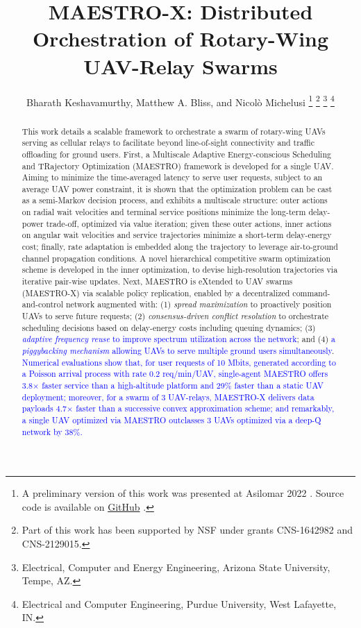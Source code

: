 \documentclass[12pt, draftcls, onecolumn]{IEEEtran}
\title{MAESTRO-X: Distributed Orchestration of Rotary-Wing UAV-Relay Swarms}
\author{Bharath Keshavamurthy\IEEEauthorrefmark{1}, Matthew A. Bliss\IEEEauthorrefmark{2}, and Nicol\`{o} Michelusi\IEEEauthorrefmark{1}
\thanks{A preliminary version of this work was presented at Asilomar 2022 \cite{ASILOMAR}. Source code is available on \href{https://github.com/bharathkeshavamurthy/MAESTRO-X.git}{GitHub} \cite{MAESTRO-X}.}
\thanks{Part of this work has been supported by NSF under grants CNS-1642982 and CNS-2129015.}
\thanks{\IEEEauthorrefmark{1}Electrical, Computer and Energy Engineering, Arizona State University, Tempe, AZ.}
\thanks{\IEEEauthorrefmark{2}Electrical and Computer Engineering, Purdue University, West Lafayette, IN.}
\vspace{-6mm}
}
\theoremstyle{plain}
\theoremstyle{definition}
\theoremstyle{remark}
\newcommand\hlt[1]{\textcolor{blue}{#1}}
\begin{document}

\maketitle
\thispagestyle{plain}
\pagestyle{plain}
\vspace{-12mm}
\begin{abstract}
This work details a scalable framework to orchestrate a swarm of rotary-wing UAVs serving as cellular relays to facilitate beyond line-of-sight connectivity and traffic offloading for ground users. First, a Multiscale Adaptive Energy-conscious Scheduling and TRajectory Optimization (MAESTRO) framework is developed for a single UAV. Aiming to minimize the time-averaged latency to serve user requests, subject to an average UAV power constraint, it is shown that the optimization problem can be cast as a semi-Markov decision process, and exhibits a multiscale structure: outer actions on radial wait velocities and terminal service positions minimize the long-term delay-power trade-off, optimized via value iteration; given these outer actions, inner actions on angular wait velocities and service trajectories minimize a short-term delay-energy cost; finally, rate adaptation is embedded along the trajectory to leverage air-to-ground channel propagation conditions. A novel hierarchical competitive swarm optimization scheme is developed in the inner optimization, to devise high-resolution trajectories via iterative pair-wise updates. Next, MAESTRO is eXtended to UAV swarms (MAESTRO-X) via scalable policy replication, enabled by a decentralized command-and-control network augmented with: 
(1) \emph{spread maximization} to proactively position UAVs to serve future requests;
(2) \emph{consensus-driven conflict resolution} to orchestrate scheduling decisions based on delay-energy costs including queuing dynamics;
(3) \hlt{\emph{adaptive frequency reuse} to improve spectrum utilization across the network}; and 
(4) \hlt{a \emph{piggybacking mechanism} allowing UAVs to serve multiple ground users simultaneously}. 
\hlt{Numerical evaluations show that, for user requests of 10 Mbits, generated according to a Poisson arrival process with rate 0.2 req/min/UAV, single-agent MAESTRO offers 3.8$\times$ faster service than a high-altitude platform and 29\% faster than a static UAV deployment; moreover, for a swarm of 3 UAV-relays, MAESTRO-X delivers data payloads 4.7$\times$ faster than a successive convex approximation scheme; and remarkably, a single UAV optimized via MAESTRO outclasses 3 UAVs optimized via a deep-Q network by $38$\%.}
\end{abstract}
\vspace{-4mm}
\end{document}
